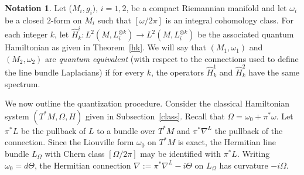 \documentclass[12pt,leqno]{amsart}%
\theoremstyle{definition}
\newtheorem{nota}[theorem]{Notation}
\theoremstyle{remark}
\numberwithin{equation}{section}
\def\nab{{\nabla}}
\begin{document}
\begin{nota}\label{qe} Let ($M_i, g_i)$, $i=1,2$, be a compact Riemannian
manifold and
let $\omega_i$ be a closed $2$-form on $M_i$ such that $[\omega/2\pi]$
is an integral cohomology
class.   For each integer $k$, let $\widehat{H}_{k}^i:L^{2}(M,L_i^{\otimes
k})\rightarrow
L^{2}(M,L_i^{\otimes k})$ be the associated quantum Hamiltonian as given in
Theorem~\ref{hk}.
  We will say that $(M_1,
\omega_1)$ and $(M_2,\omega_2)$ are \emph{quantum equivalent} (with respect to
the connections used to define the line bundle Laplacians) if for every $k$, the
operators $\widehat{H}_{k}^1$ and $\widehat{H}_{k}^2$ have the same spectrum.
\end{nota}

We now outline the quantization procedure.  Consider the classical Hamiltonian
system $(T^*M,\Omega, H)$ given in Subsection~\ref{class}.  Recall that
$\Omega=\omega_0+\pi^*\omega$.  Let $\pi^{\ast}L$ be the pullback of
$L$  to a bundle over $T^*M$ and $\pi^*\nab^L$ the pullback of the connection.
Since the Liouville form $\omega_0$ on $T^*M$ is exact, the Hermitian line
bundle $L_\Omega$ with Chern class $[\Omega/2\pi]$ may be identified
with $\pi^{\ast}L$.  Writing $\omega_0=d\Theta$, the Hermitian connection
$\nab:=\pi^{\ast}\nab^L -i\Theta$ on $L_\Omega$ has curvature $-i\Omega$.
\end{document}
